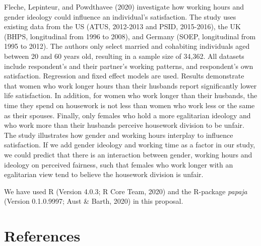\documentclass[
  english,
  man]{apa6}
\begin{document}
Fleche, Lepinteur, and Powdthavee (2020) investigate how working hours and gender ideology could influence an individual's satisfaction. The study uses existing data from the US (ATUS, 2012-2013 and PSID, 2015-2016), the UK (BHPS, longitudinal from 1996 to 2008), and Germany (SOEP, longitudinal from 1995 to 2012). The authors only select married and cohabiting individuals aged between 20 and 60 years old, resulting in a sample size of 34,362. All datasets include respondent's and their partner's working patterns, and respondent's own satisfaction. Regression and fixed effect models are used. Results demonstrate that women who work longer hours than their husbands report significantly lower life satisfaction. In addition, for women who work longer than their husbands, the time they spend on housework is not less than women who work less or the same as their spouses. Finally, only females who hold a more egalitarian ideology and who work more than their husbands perceive housework division to be unfair. The study illustrates how gender and working hours interplay to influence satisfaction. If we add gender ideology and working time as a factor in our study, we could predict that there is an interaction between gender, working hours and ideology on perceived fairness, such that females who work longer with an egalitarian view tend to believe the housework division is unfair.

\hfill\break
\hfill\break

We have used R (Version 4.0.3; R Core Team, 2020) and the R-package \emph{papaja} (Version 0.1.0.9997; Aust \& Barth, 2020) in this proposal.

\newpage

\hypertarget{references}{%
\section{References}\label{references}}

\begingroup
\setlength{\parindent}{-0.5in}
\setlength{\leftskip}{0.5in}
\end{document}

